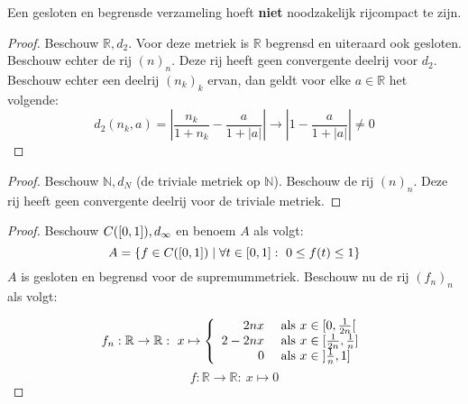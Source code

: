 \documentclass[main.tex]{subfiles}
\begin{document}
\begin{tvb}
  Een gesloten en begrensde verzameling hoeft \textbf{niet} noodzakelijk rijcompact te zijn.

  \begin{proof}
    Beschouw $\mathbb{R},d_{2}$.
    Voor deze metriek is $\mathbb{R}$ begrensd en uiteraard ook gesloten.
    Beschouw echter de rij $(n)_{n}$.
    Deze rij heeft geen convergente deelrij voor $d_{2}$.
    Beschouw echter een deelrij $(n_{k})_{k}$ ervan, dan geldt voor elke $a\in \mathbb{R}$ het volgende:
    \[ d_{2}(n_{k},a) = \left| \frac{n_{k}}{1+n_{k}} - \frac{a}{1+|a|} \right| \rightarrow \left|1-\frac{a}{1+|a|}\right| \neq 0 \]
  \end{proof}
  \begin{proof}
    Beschouw $\mathbb{N},d_{N}$ (de triviale metriek op $\mathbb{N}$).
    Beschouw de rij $(n)_{n}$.
    Deze rij heeft geen convergente deelrij voor de triviale metriek.
  \end{proof}
  \begin{proof}
    Beschouw $C(\interval{0}{1}),d_{\infty}$ en benoem $A$ als volgt:
    \[ A = \{ f\in C(\interval{0}{1}) \mid \forall t\in \interval{0}{1}:\ 0 \le f(t) \le 1 \} \]
    $A$ is gesloten en begrensd voor de supremummetriek.
    Beschouw nu de rij $(f_{n})_{n}$ als volgt:

    \noindent
    \begin{minipage}{.45\textwidth}
      \begin{figure}[H]
        \centering
      \end{figure}
    \end{minipage}
    \begin{minipage}{.45\textwidth}
      \[
      f_{n}: \mathbb{R} \rightarrow \mathbb{R}:\ x \mapsto
      \left\{
        \begin{array}{rl}
          2nx   & \text{ als } x \in \interval[open right]{0}{\frac{1}{2n}}\\
          2-2nx & \text{ als } x \in \interval{\frac{1}{2n}}{\frac{1}{n}}\\
          0     & \text{ als } x \in \interval[open left ]{\frac{1}{n}}{1}\\
        \end{array}
      \right.
      \]
      \[ f: \mathbb{R} \rightarrow \mathbb{R}:\ x \mapsto 0 \]
    \end{minipage}


\end{proof}
\end{tvb}
\end{document}
